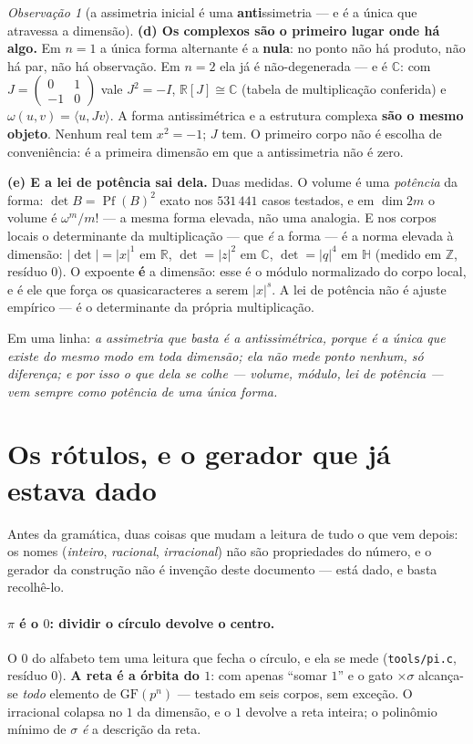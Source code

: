 \documentclass[11pt]{article}
\newcommand{\code}[1]{\texttt{\small #1}}
\newcommand{\Z}{\mathbb Z}
\newcommand{\R}{\mathbb R}
\newcommand{\GF}{\mathrm{GF}}
\newcommand{\C}{\mathbb C}
\newcommand{\Hq}{\mathbb H}
\newcommand{\Pf}{\operatorname{Pf}}
\theoremstyle{plain}
\theoremstyle{remark}
\newtheorem{obs}{Observação}
\begin{document}
\begin{obs}[a assimetria inicial é uma \textbf{anti}ssimetria --- e é a única que atravessa a dimensão]
\textbf{(d) Os complexos são o primeiro lugar onde há algo.} Em $n=1$ a única forma alternante é a
\textbf{nula}: no ponto não há produto, não há par, não há observação. Em $n=2$ ela já é
não-degenerada --- e é $\C$: com $J=\left(\begin{smallmatrix}0&1\\-1&0\end{smallmatrix}\right)$ vale $J^2=-I$,
$\R[J]\cong\C$ (tabela de multiplicação conferida) e $\omega(u,v)=\langle u,Jv\rangle$. A forma
antissimétrica e a estrutura complexa \textbf{são o mesmo objeto}. Nenhum real tem $x^2=-1$; $J$ tem. O
primeiro corpo não é escolha de conveniência: é a primeira dimensão em que a antissimetria não é zero.

\textbf{(e) E a lei de potência sai dela.} Duas medidas. O volume é uma \emph{potência} da forma:
$\det B=\Pf(B)^2$ exato nos $531\,441$ casos testados, e em $\dim 2m$ o volume é $\omega^m/m!$ --- a
mesma forma elevada, não uma analogia. E nos corpos locais o determinante da multiplicação --- que
\emph{é} a forma --- é a norma elevada à dimensão: $|{\det}|=|x|^1$ em $\R$, $\det=|z|^2$ em $\C$,
$\det=|q|^4$ em $\Hq$ (medido em $\Z$, resíduo $0$). O expoente \textbf{é} a dimensão: esse é o módulo
normalizado do corpo local, e é ele que força os quasicaracteres a serem $|x|^s$. A lei de potência não
é ajuste empírico --- é o determinante da própria multiplicação.

Em uma linha: \emph{a assimetria que basta é a antissimétrica, porque é a única que existe do mesmo modo
em toda dimensão; ela não mede ponto nenhum, só diferença; e por isso o que dela se colhe --- volume,
módulo, lei de potência --- vem sempre como potência de uma única forma.}
\end{obs}

\section{Os rótulos, e o gerador que já estava dado}

Antes da gramática, duas coisas que mudam a leitura de tudo o que vem depois: os nomes
(\emph{inteiro}, \emph{racional}, \emph{irracional}) não são propriedades do número, e o gerador da
construção não é invenção deste documento --- está dado, e basta recolhê-lo.

\paragraph{$\pi$ é o $0$: dividir o círculo devolve o centro.}\label{obs:pi}
O $0$ do alfabeto tem uma leitura que fecha o círculo, e ela se mede (\code{tools/pi.c}, resíduo $0$).
\textbf{A reta é a órbita do $1$}: com apenas ``somar $1$'' e o gato $\times\sigma$ alcança-se
\emph{todo} elemento de $\GF(p^n)$ --- testado em seis corpos, sem exceção. O irracional colapsa no $1$
da dimensão, e o $1$ devolve a reta inteira; o polinômio mínimo de $\sigma$ \emph{é} a descrição da
reta.
\end{document}
